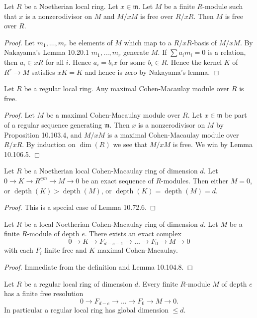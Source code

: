 \begin{lemma}[10.106.5]
Let $R$ be a Noetherian local ring. Let $x\in\mathfrak m$. Let $M$ be a finite $R$-module such that $x$ is a nonzerodivisor on $M$ and $M/xM$ is free over $R/xR$. Then $M$ is free over $R$.
\end{lemma}
\begin{proof}
Let $m_1,\ldots,m_r$ be elements of $M$ which map to a $R/xR$-basis of $M/xM$. By Nakayama's Lemma 10.20.1 $m_1,\ldots,m_r$ generate $M$. If $\sum a_im_i=0$ is a relation, then $a_i\in xR$ for all $i$. Hence $a_i=b_ix$ for some $b_i\in R$. Hence the kernel $K$ of $R^r\to M$ satisfies $xK=K$ and hence is zero by Nakayama's lemma.
\end{proof}
\begin{lemma}[10.106.6]
Let $R$ be a regular local ring. Any maximal Cohen-Macaulay module over $R$ is free.
\end{lemma}
\begin{proof}
Let $M$ be a maximal Cohen-Macaulay module over $R$. Let $x\in\mathfrak m$ be part of a regular sequence generating $\mathfrak m$. Then $x$ is a nonzerodivisor on $M$ by Proposition 10.103.4, and $M/xM$ is a maximal Cohen-Macaulay module over $R/xR$. By induction on $\dim(R)$ we see that $M/xM$ is free. We win by Lemma 10.106.5.
\end{proof}
\begin{lemma}[10.104.8]
Let $R$ be a Noetherian local Cohen-Macaulay ring of dimension $d$. Let $0\to K\to R^{\oplus n}\to M\to0$ be an exact sequence of $R$-modules. Then either $M=0$, or $\operatorname{depth}(K)>\operatorname{depth}(M)$, or $\operatorname{depth}(K)=\operatorname{depth}(M)=d$.
\end{lemma}
\begin{proof}
This is a special case of Lemma 10.72.6.
\end{proof}
\begin{lemma}[10.104.9]
Let $R$ be a local Noetherian Cohen-Macaulay ring of dimension $d$. Let $M$ be a finite $R$-module of depth $e$. There exists an exact complex
\[
0\to K\to F_{d-e-1}\to\ldots\to F_0\to M\to0
\]
with each $F_i$ finite free and $K$ maximal Cohen-Macaulay.
\end{lemma}
\begin{proof}
Immediate from the definition and Lemma 10.104.8.
\end{proof}
\begin{proposition}[10.110.1]
Let $R$ be a regular local ring of dimension $d$. Every finite $R$-module $M$ of depth $e$ has a finite free resolution
\[
0\to F_{d-e}\to\ldots\to F_0\to M\to0.
\]
In particular a regular local ring has global dimension $\leq d$.
\end{proposition}
